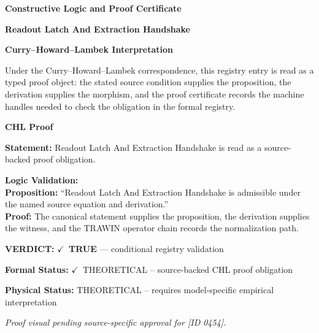 \clearpage
\begingroup\tzpsupportsetup
\noindent\textbf{\fontsize{10.8pt}{12.8pt}\selectfont [ID 0454] Constructive Logic and Proof Certificate}\par
\noindent\textbf{\fontsize{10pt}{12pt}\selectfont Readout Latch And Extraction Handshake}\par
\vspace{0.45em}
\begingroup
\footnotesize
\setlength{\parskip}{0.22em}
\setlength{\parindent}{0pt}
\noindent\textbf{Curry--Howard--Lambek Interpretation}\par
Under the Curry--Howard--Lambek correspondence, this registry entry is read as a typed proof
object: the stated source condition supplies the proposition, the derivation supplies the
morphism, and the proof certificate records the machine handles needed to check the obligation
in the formal registry.

\vspace{0.45em}
\noindent\textbf{CHL Proof}\par
\textbf{Statement:} Readout Latch And Extraction Handshake is read as a source-backed proof obligation.

\textbf{Logic Validation:}\\
\textbf{Proposition:} ``Readout Latch And Extraction Handshake is admissible under the named source equation and derivation.''\\
\textbf{Proof:} The canonical statement supplies the proposition, the derivation supplies the witness, and the TRAWIN operator chain records the normalization path.

\textbf{VERDICT:} \ensuremath{\checkmark}\ \textbf{TRUE} --- conditional registry validation

\textbf{Formal Status:} \ensuremath{\checkmark}\ THEORETICAL -- source-backed CHL proof obligation

\textbf{Physical Status:} THEORETICAL -- requires model-specific empirical interpretation
\par\vspace{0.45em}
\par
\vfill
\begingroup\footnotesize\itshape
Proof visual pending source-specific approval for [ID 0454].
\par\endgroup
\vfill
\endgroup
\endgroup
